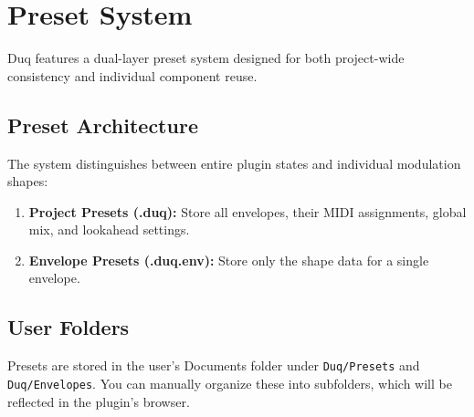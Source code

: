 \chapter{Preset System}
\label{ch:preset_system}

Duq features a dual-layer preset system designed for both project-wide consistency and individual component reuse.

\section{Preset Architecture}
The system distinguishes between entire plugin states and individual modulation shapes:
\begin{enumerate}
    \item \textbf{Project Presets (.duq):} Store all envelopes, their MIDI assignments, global mix, and lookahead settings.
    \item \textbf{Envelope Presets (.duq.env):} Store only the shape data for a single envelope.
\end{enumerate}

\section{User Folders}
Presets are stored in the user's Documents folder under \texttt{Duq/Presets} and \texttt{Duq/Envelopes}. You can manually organize these into subfolders, which will be reflected in the plugin's browser.
